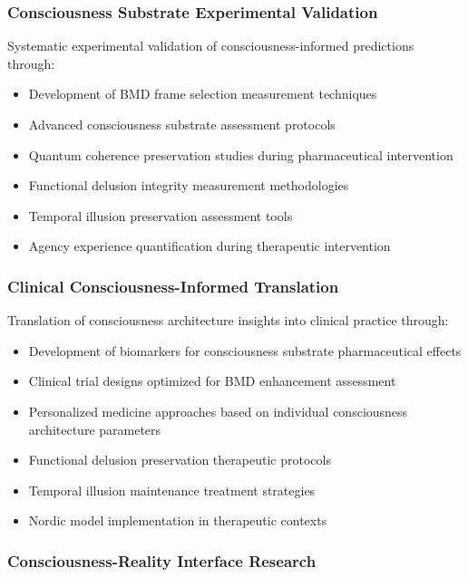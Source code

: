 \documentclass[12pt,a4paper]{article}
\begin{document}
\subsubsection{Consciousness Substrate Experimental Validation}

Systematic experimental validation of consciousness-informed predictions through:

\begin{itemize}
\item Development of BMD frame selection measurement techniques
\item Advanced consciousness substrate assessment protocols
\item Quantum coherence preservation studies during pharmaceutical intervention
\item Functional delusion integrity measurement methodologies
\item Temporal illusion preservation assessment tools
\item Agency experience quantification during therapeutic intervention
\end{itemize}

\subsubsection{Clinical Consciousness-Informed Translation}

Translation of consciousness architecture insights into clinical practice through:

\begin{itemize}
\item Development of biomarkers for consciousness substrate pharmaceutical effects
\item Clinical trial designs optimized for BMD enhancement assessment
\item Personalized medicine approaches based on individual consciousness architecture parameters
\item Functional delusion preservation therapeutic protocols
\item Temporal illusion maintenance treatment strategies
\item Nordic model implementation in therapeutic contexts
\end{itemize}

\subsubsection{Consciousness-Reality Interface Research}
\end{document}
